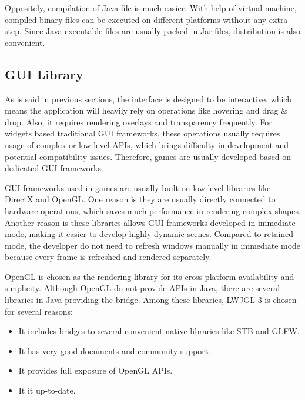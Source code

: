 \documentclass[msc,deptreport, cs]{infthesis}
\begin{document}
Oppositely, compilation of Java file is much easier. With help of virtual machine, compiled binary files can be executed on different platforms without any extra step. Since Java executable files are usually packed in Jar files, distribution is also convenient.

\subsection{GUI Library}

As is said in previous sections, the interface is designed to be interactive, which means the application will heavily rely on operations like hovering and drag \& drop. Also, it requires rendering overlays and transparency frequently. For widgets based traditional GUI frameworks, these operations usually requires usage of complex or low level APIs, which brings difficulty in development and potential compatibility issues. Therefore, games are usually developed based on dedicated GUI frameworks.

GUI frameworks used in games are usually built on low level libraries like DirectX and OpenGL. One reason is they are usually directly connected to hardware operations, which saves much performance in rendering complex shapes. Another reason is these libraries allows GUI frameworks developed in immediate mode, making it easier to develop highly dynamic scenes. Compared to retained mode, the developer do not need to refresh windows manually in immediate mode because every frame is refreshed and rendered separately.

OpenGL is chosen as the rendering library for its cross-platform availability and simplicity. Although OpenGL do not provide APIs in Java, there are several libraries in Java providing the bridge. Among these libraries, LWJGL 3 is chosen for several reasons:

\begin{itemize}
  \vspace{-1em}\item It includes bridges to several convenient native libraries like STB and GLFW.
  \vspace{-1em}\item It has very good documents and community support.
  \vspace{-1em}\item It provides full exposure of OpenGL APIs.
  \vspace{-1em}\item It it up-to-date.
\end{itemize}
\end{document}

